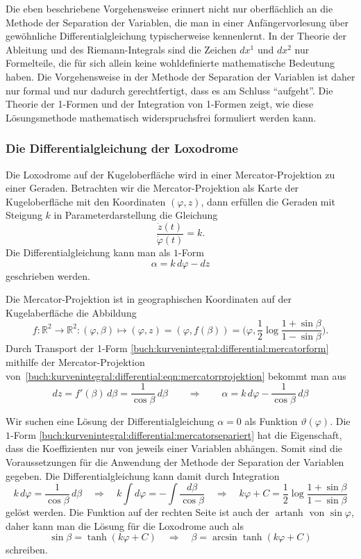 Die eben beschriebene Vorgehensweise erinnert nicht nur oberflächlich
an die Methode der Separation der Variablen, die man in einer
Anfängervorlesung über gewöhnliche Differentialgleichung typischerweise
kennenlernt.
In der Theorie der Ableitung und des Riemann-Integrals sind die Zeichen
$dx^1$ und $dx^2$ nur Formelteile, die für sich allein keine
wohldefinierte mathematische Bedeutung haben.
Die Vorgehensweise in der Methode der Separation der Variablen ist
daher nur formal und nur dadurch gerechtfertigt, dass es am Schluss
``aufgeht''.
Die Theorie der 1-Formen und der Integration von 1-Formen zeigt,
wie diese Lösungsmethode mathematisch widerspruchsfrei formuliert
werden kann.

%
%
\subsubsection{Die Differentialgleichung der Loxodrome}
Die Loxodrome auf der Kugeloberfläche wird in einer Mercator-Projektion
zu einer Geraden.
Betrachten wir die Mercator-Projektion als Karte der Kugeloberfläche
mit den Koordinaten $(\varphi,z)$, dann erfüllen die Geraden mit
Steigung $k$ in Parameterdarstellung die Gleichung
\[
\frac{\dot{z}(t)}{\dot{\varphi}(t)}
=
k.
\]
Die Differentialgleichung kann man als $1$-Form 
\begin{equation}
\alpha
=
k\,d\varphi - dz
\label{buch:kurvenintegral:differential:mercatorform}
\end{equation}
geschrieben werden.

Die Mercator-Projektion ist in geographischen Koordinaten
auf der Kugelaberfläche die Abbildung
\[
f\colon
\mathbb{R}^2\to\mathbb{R}^2
:
(\varphi,\beta)
\mapsto
(\varphi,z)
=
(\varphi,f(\beta))
=
\biggl(\varphi,\frac12\log\frac{1+\sin\beta}{1-\sin\beta}\biggr).
\]
Durch Transport der 1-Form
\eqref{buch:kurvenintegral:differential:mercatorform}
mithilfe der Mercator-Projektion
von~\eqref{buch:kurvenintegral:differential:eqn:mercatorprojektion}
bekommt man aus
\begin{equation}
dz
=
f'(\beta)\,d\beta
=
\frac{1}{\cos\beta}\,d\beta
\qquad\Rightarrow\qquad
\alpha
=
k\,d\varphi-\frac{1}{\cos\beta}\,d\beta
\label{buch:kurvenintegral:differential:mercatorsepariert}
\end{equation}

Wir suchen eine Lösung der Differentialgleichung $\alpha=0$
als Funktion $\vartheta(\varphi)$.
Die $1$-Form
\eqref{buch:kurvenintegral:differential:mercatorsepariert}
hat die Eigenschaft, dass die Koeffizienten nur von jeweils
einer Variablen abhängen.
Somit sind die Voraussetzungen für die Anwendung der Methode
der Separation der Variablen gegeben.
Die Differentialgleichung kann damit durch Integration
\[
k\,d\varphi=\frac{1}{\cos\beta}\,d\beta
\quad
\Rightarrow
\quad
k\int d\varphi
=-
\int \frac{d\beta}{\cos\beta}
\quad
\Rightarrow
\quad
k\varphi + C
=
\frac12
\log\frac{1+\sin\beta}{1-\sin\beta}
\]
gelöst werden.
Die Funktion auf der rechten Seite ist auch der $\operatorname{artanh}$
von $\sin\varphi$, daher kann man die Lösung für die Loxodrome auch
als
\[
\sin\beta
=
\tanh(k\varphi+C)
\quad
\Rightarrow
\quad
\beta = \arcsin\tanh(k\varphi+C)
\]
schreiben.


